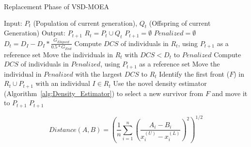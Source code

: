 \begin{algorithm}[t]
        \caption{Replacement Phase of VSD-MOEA}
\begin{small}
\begin{algorithmic}[1]
\STATE Input: $P_t$ (Population of current generation), $Q_t$ (Offspring of current Generation)
        \STATE Output: $P_{t+1}$
        \STATE $R_t = P_t \cup Q_t$ \label{alg:1}
        \STATE $P_{t+1} = \emptyset$ \label{alg:2}
        \STATE $Penalized = \emptyset$ \label{alg:3}
                                \STATE $D_t = D_I - D_I * \frac{G_{Elapsed}}{0.5*G_{End}}$ \label{alg:4}
         \label{alg:6}
                                        \STATE Compute $DCS$ of individuals in $R_t$, using $P_{t+1}$ as a reference set \label{alg:7}
                                        \STATE Move the individuals in $R_t$ with $DCS < D_t$ to $Penalized$ \label{alg:8}
                 \label{alg:9}
                                                \STATE Compute $DCS$ of individuals in $Penalized$, using $P_{t+1}$ as a reference set \label{alg:10}
                                                \STATE Move the individual in $Penalized$ with the largest $DCS$ to $R_t$ \label{alg:11}
                \ENDIF
                                        \STATE Identify the first front ($F$) in $R_t \cup P_{t+1}$ with an individual $I \in R_t$ \label{alg:12}
                                        \STATE Use the novel density estimator (Algorithm~\ref{alg:Density_Estimator}) to select a new survivor
                                        from $F$ and move it to $P_{t+1}$\label{alg:13}
        \ENDWHILE
        \RETURN $P_{t+1}$ \label{alg:14}
        \end{algorithmic}
\end{small}
\label{alg:Replacement_Phase}
\end{algorithm}


\begin{equation}\label{eqn:distance}
Distance(A, B) =   \left ( \frac{1}{n}  \sum_{i=1}^n \left ( \frac{A_i - B_i}{x_i^{(U)} - x_i^{(L)}} \right )^2  \right)^{1/2}
\end{equation}


